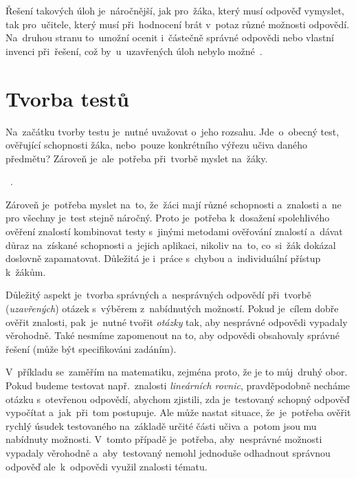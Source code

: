 \documentclass[11pt,a4paper]{report}
\begin{document}
            Řešení takových úloh je~náročnější, jak pro~žáka, který musí odpověď vymyslet, tak pro~učitele, který musí při~hodnocení brát v~potaz různé možnosti odpovědí. Na~druhou stranu to~umožní ocenit i~částečně správné odpovědi nebo vlastní invenci při~řešení, což by~u~uzavřených úloh nebylo možné~\cite{rozhlasOUtazky}.

        \section{Tvorba testů}
            Na~začátku tvorby testu je~nutné uvažovat o~jeho rozsahu. Jde~o~obecný test, ověřující schopnosti žáka, nebo~pouze konkrétního výřezu učiva daného předmětu?
            Zároveň je~ale~potřeba při~tvorbě myslet na~žáky.

            ~\cite{Suchoradsky:testy}.

            Zároveň je~potřeba myslet na~to, že~žáci mají různé schopnosti a~znalosti a~ne pro všechny je~test stejně náročný. Proto je~potřeba k~dosažení spolehlivého ověření znalostí kombinovat testy s~jinými metodami ověřování znalostí a~dávat důraz na~získané schopnosti a~jejich aplikaci, nikoliv na~to, co~si~žák dokázal doslovně zapamatovat. Důležitá je i~práce s~chybou a~individuální přístup k~žákům. \cite{chraska:testy, Berkley2017LearningFromErrors}
            
            Důležitý aspekt je~tvorba správných a~nesprávných odpovědí při~tvorbě (\emph{uzavřených}) otázek s~výběrem z~nabídnutých možností. Pokud je~cílem dobře ověřit znalosti, pak~je~nutné tvořit \emph{otázky} tak, aby nesprávné odpovědi vypadaly věrohodně. Také nesmíme zapomenout na to, aby odpovědi obsahovaly správné řešení (může být specifikováni zadáním).

            V~příkladu se~zaměřím na matematiku, zejména proto, že je to můj~druhý obor. Pokud budeme testovat např.~znalosti \emph{lineárních rovnic}, pravděpodobně necháme otázku s~otevřenou odpovědí, abychom zjistili, zda je~testovaný schopný odpověď vypočítat a~jak~při~tom postupuje. Ale může nastat situace, že~je~potřeba ověřit rychlý úsudek testovaného na~základě určité části učiva a~potom jsou mu nabídnuty možnosti. V~tomto případě je~potřeba, aby~nesprávné možnosti vypadaly věrohodně a~aby~testovaný nemohl jednoduše odhadnout správnou odpověď ale~k~odpovědi využil znalosti tématu.
\end{document}
